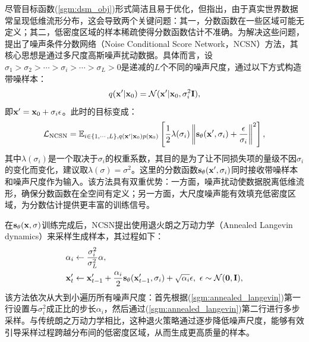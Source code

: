\documentclass[11pt,a4paper,UTF8]{ctexart}
\begin{document}
尽管目标函数(\ref{sgm:dsm_obj})形式简洁且易于优化，但\cite{song2019generative}指出，由于真实世界数据常呈现低维流形分布，这会导致两个关键问题：其一，分数函数在一些区域可能无定义；其二，低密度区域的样本稀疏使得分数函数估计不准确。为解决这些问题，\cite{song2019generative}提出了噪声条件分数网络（Noise Conditional Score Network，NCSN）方法，其核心思想是通过多尺度高斯噪声扰动数据。具体而言，设$\sigma_1 > \sigma_2 > \cdots > \sigma_i > \cdots > \sigma_L > 0$是递减的$L$个不同的噪声尺度，通过以下方式构造带噪样本：
\begin{equation}
    q(\mathbf{x}^\prime|\mathbf{x}_0)=\mathcal{N}(\mathbf{x}^\prime|\mathbf{x}_0,\sigma_i^2\mathbf{I}),
\label{sgm:ncsn_forward}
\end{equation}
即$\mathbf{x}^\prime=\mathbf{x}_0+\sigma_i\epsilon$。此时的目标变成：
\begin{align}
\begin{split}
    \mathcal{L}_{\text{NCSN}}=\mathbb{E}_{i\in\{1,\cdots,L\},q(\mathbf{x}^\prime|\mathbf{x}_0)p(\mathbf{x}_0)} \left[\frac{1}{2} \lambda(\sigma_i)\left\| \mathbf{s}_\theta(\mathbf{x}^\prime,\sigma_i) + \frac{\epsilon}{\sigma_i} \right\|^2 \right],
\end{split}
\label{sgm:ncsn}
\end{align}
其中$\lambda(\sigma_i)$是一个取决于$\sigma_i$的权重系数，其目的是为了让不同损失项的量级不因$\sigma_i$的变化而变化，\cite{song2019generative}建议取$\lambda(\sigma)=\sigma^2$。这里的分数函数$\mathbf{s}_\theta(\mathbf{x}^\prime,\sigma_i)$同时接收带噪样本和噪声尺度作为输入。该方法具有双重优势：一方面，噪声扰动使数据脱离低维流形，确保分数函数在全空间有定义；另一方面，大尺度噪声能有效填充低密度区域，为分数估计提供更丰富的训练信号。

在$\mathbf{s}_\theta(\mathbf{x},\sigma)$训练完成后，NCSN提出使用退火朗之万动力学（Annealed Langevin dynamics）来采样生成样本，其过程如下：
\begin{align}
\begin{split}
\alpha_i &\leftarrow \frac{\sigma_i^2}{\sigma_L^2}\alpha, \\
\mathbf{x}^\prime_t & \leftarrow\mathbf{x}^\prime_{t-1} + \frac{\alpha_i}{2}\mathbf{s}_{\theta}(\mathbf{x}^\prime_{t-1},\sigma_i) + \sqrt{\alpha_i}\epsilon,\ \epsilon\sim\mathcal{N}(\mathbf{0},\mathbf{I}),
\end{split}
\label{sgm:annealed_langevin}
\end{align}
该方法依次从大到小遍历所有噪声尺度：首先根据(\ref{sgm:annealed_langevin})第一行设置与$\sigma_i^2$成正比的步长$\alpha_i$，然后通过(\ref{sgm:annealed_langevin})第二行进行多步采样。与传统朗之万动力学相比，这种退火策略通过逐步降低噪声尺度，能够有效引导采样过程跨越分布间的低密度区域，从而生成更高质量的样本\cite{song2019generative}。
\end{document}
